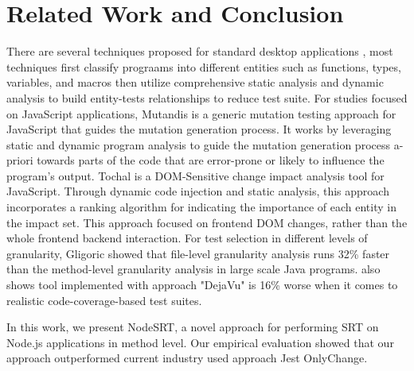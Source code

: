 \documentclass[10pt, conference]{IEEEtran}
\begin{document}
\section{Related Work and Conclusion}
There are several techniques proposed for standard desktop applications \cite{b2, b3, b4, b5, b7, b9, b12, b13, b14, b17}, most techniques 
first classify prograams into different entities such as functions, types, variables, and macros then utilize comprehensive static analysis 
and dynamic analysis to build entity-tests relationships to reduce test suite.
For studies focused on JavaScript applications, Mutandis \cite{b11} is a generic mutation testing 
approach for JavaScript that guides the mutation generation process. It works by leveraging static and dynamic program 
analysis to guide the mutation generation process a-priori towards parts of the code that are error-prone or 
likely to influence the program’s output. 
Tochal \cite{b1} is a DOM-Sensitive change impact analysis tool for JavaScript. Through dynamic code injection and static analysis, this 
approach incorporates a ranking algorithm for indicating the importance of each entity in the impact set. This 
approach focused on frontend DOM changes, rather than the whole frontend backend interaction. For test selection in different levels 
of granularity, Gligoric \cite{b6} showed that file-level granularity 
analysis runs 32\% faster than the method-level granularity analysis in large scale Java programs.\cite{b15} also shows 
tool implemented with approach "DejaVu" \cite{b14} is 16\% worse when it comes to realistic code-coverage-based test suites.

In this work, we present NodeSRT, a novel approach for performing SRT on Node.js applications in method level. Our empirical evaluation 
showed that our approach outperformed current industry used approach Jest OnlyChange.
\end{document}
